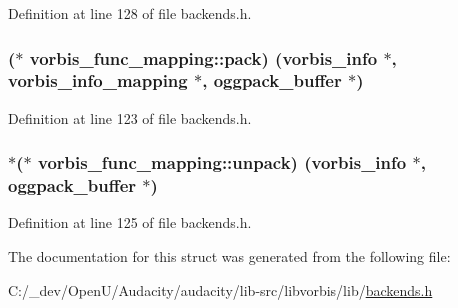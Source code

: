 Definition at line 128 of file backends.\+h.

\subsubsection[{\texorpdfstring{pack}{pack}}]{($\ast$ vorbis\+\_\+func\+\_\+mapping\+::pack) ({\bf vorbis\+\_\+info} $\ast$, {\bf vorbis\+\_\+info\+\_\+mapping} $\ast$, {\bf oggpack\+\_\+buffer} $\ast$)}\hypertarget{structvorbis__func__mapping_ac4f073ce01ba6cddc7710e08d2819b4f}{}\label{structvorbis__func__mapping_ac4f073ce01ba6cddc7710e08d2819b4f}


Definition at line 123 of file backends.\+h.

\subsubsection[{\texorpdfstring{unpack}{unpack}}]{$\ast$($\ast$ vorbis\+\_\+func\+\_\+mapping\+::unpack) ({\bf vorbis\+\_\+info} $\ast$, {\bf oggpack\+\_\+buffer} $\ast$)}\hypertarget{structvorbis__func__mapping_a1ca1a1d90d6bd107b904c1f1fac35d00}{}\label{structvorbis__func__mapping_a1ca1a1d90d6bd107b904c1f1fac35d00}


Definition at line 125 of file backends.\+h.



The documentation for this struct was generated from the following file\+:\begin{DoxyCompactItemize}
\item 
C\+:/\+\_\+dev/\+Open\+U/\+Audacity/audacity/lib-\/src/libvorbis/lib/\hyperlink{backends_8h}{backends.\+h}\end{DoxyCompactItemize}
